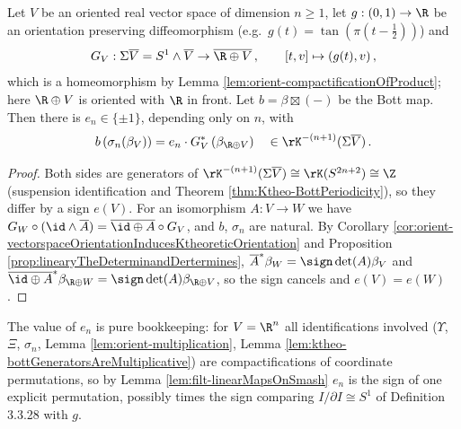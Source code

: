 \begin{lemma}\label{lem:filt-suspensionOfOrientations}
	Let $V$ be an oriented real vector space of dimension $n\geq 1$, let $g:(0,1)\to\R$ be an orientation preserving diffeomorphism (e.g.\ $g(t)=\tan(\pi(t-\frac12))$) and
	\begin{equation*}
		G_V:\Sigma\overline{V}=S^1\wedge\overline{V}\to\overline{\R\oplus V}\,,\qquad [t,v]\mapsto (g(t),v)\,,
	\end{equation*}
	which is a homeomorphism by Lemma \ref{lem:orient-compactificationOfProduct}; here $\R\oplus V$ is oriented with $\R$ in front. Let $b=\beta\boxtimes(-)$ be the Bott map. Then there is $e_n\in\{\pm1\}$, depending only on $n$, with
	\begin{equation*}
		b\left(\sigma_n(\beta_V)\right)=e_n\cdot G_V^*\left(\beta_{\R\oplus V}\right)\quad\in \rK^{-(n+1)}(\Sigma\overline{V})\,.
	\end{equation*}
\end{lemma}
\begin{proof}
	Both sides are generators of $\rK^{-(n+1)}(\Sigma\overline V)\cong\rK(S^{2n+2})\cong\Z$ (suspension identification and Theorem \ref{thm:Ktheo-BottPeriodicity}), so they differ by a sign $e(V)$. For an isomorphism $A:V\to W$ we have $G_W\circ(\id\wedge\overline A)=\overline{\id\oplus A}\circ G_V$, and $b$, $\sigma_n$ are natural. By Corollary \ref{cor:orient-vectorspaceOrientationInducesKtheoreticOrientation} and Proposition \ref{prop:linearyTheDeterminandDertermines}, $\overline A^*\beta_W=\sign\det(A)\beta_V$ and $\overline{\id\oplus A}^*\beta_{\R\oplus W}=\sign\det(A)\beta_{\R\oplus V}$, so the sign cancels and $e(V)=e(W)$.
\end{proof}

\begin{remark}\label{rem:filt-valueOfTheSign}
	The value of $e_n$ is pure bookkeeping: for $V=\R^n$ all identifications involved ($\Upsilon$, $\Xi$, $\sigma_n$, Lemma \ref{lem:orient-multiplication}, Lemma \ref{lem:ktheo-bottGeneratorsAreMultiplicative}) are compactifications of coordinate permutations, so by Lemma \ref{lem:filt-linearMapsOnSmash} $e_n$ is the sign of one explicit permutation, possibly times the sign comparing $I/\partial I\cong S^1$ of Definition 3.3.28 with $g$.
\end{remark}

